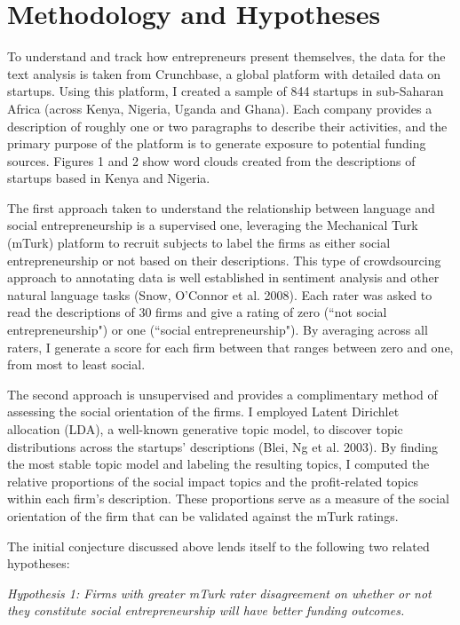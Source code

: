 \documentclass[12pt]{article}
\begin{document}
\section{Methodology and Hypotheses}

To understand and track how entrepreneurs present themselves, the data for the text analysis is taken from Crunchbase, a global platform with detailed data on startups. Using this platform, I created a sample of 844 startups in sub-Saharan Africa (across Kenya, Nigeria, Uganda and Ghana). Each company provides a description of roughly one or two paragraphs to describe their activities, and the primary purpose of the platform is to generate exposure to potential funding sources. Figures 1 and 2 show word clouds created from the descriptions of startups based in Kenya and Nigeria. 

The first approach taken to understand the relationship between language and social entrepreneurship is a supervised one, leveraging the Mechanical Turk (mTurk) platform to recruit subjects to label the firms as either social entrepreneurship or not based on their descriptions. This type of crowdsourcing approach to annotating data is well established in sentiment analysis and other natural language tasks (Snow, O'Connor et al. 2008). Each rater was asked to read the descriptions of 30 firms and give a rating of zero (``not social entrepreneurship") or one (``social entrepreneurship"). By averaging across all raters, I generate a score for each firm between that ranges between zero and one, from most to least social.  

The second approach is unsupervised and provides a complimentary method of assessing the social orientation of the firms. I employed Latent Dirichlet allocation (LDA), a well-known generative topic model, to discover topic distributions across the startups’ descriptions (Blei, Ng et al. 2003). By finding the most stable topic model and labeling the resulting topics, I computed the relative proportions of the social impact topics and the profit-related topics within each firm’s description. These proportions serve as a measure of the social orientation of the firm that can be validated against the mTurk ratings.

The initial conjecture discussed above lends itself to the following two related hypotheses:

\textit{Hypothesis 1: Firms with greater mTurk rater disagreement on whether or not they constitute social entrepreneurship will have better funding outcomes.}
\end{document}
